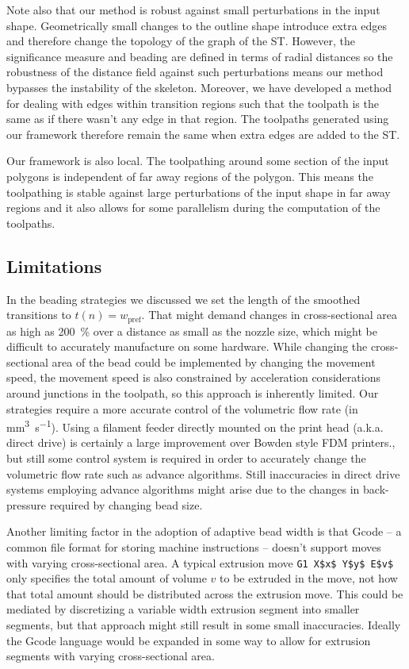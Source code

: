 Note also that our method is robust against small perturbations in the input shape.
Geometrically small changes to the outline shape introduce extra edges and therefore change the topology of the graph of the ST.
However, the significance measure and beading are defined in terms of radial distances so the robustness of the distance field against such perturbations means our method bypasses the instability of the skeleton.
Moreover, we have developed a method for dealing with edges within transition regions such that the toolpath is the same as if there wasn't any edge in that region.
The toolpaths generated using our framework therefore remain the same when extra edges are added to the ST.

Our framework is also local.
The toolpathing around some section of the input polygons is independent of far away regions of the polygon.
This means the toolpathing is stable against large perturbations of the input shape in far away regions
and it also allows for some parallelism during the computation of the toolpaths.



\subsection{Limitations}
In the beading strategies we discussed we set the length of the smoothed transitions to $t(n) = w_\text{pref}$.
That might demand changes in cross-sectional area as high as \SI{200}{\percent} over a distance as small as the nozzle size,
which might be difficult to accurately manufacture on some hardware.
While changing the cross-sectional area of the bead could be implemented by changing the movement speed, the movement speed is also constrained by acceleration considerations around junctions in the toolpath, so this approach is inherently limited.
Our strategies require a more accurate control of the volumetric flow rate (in \si{\milli\meter\cubed\per\second}).
Using a filament feeder directly mounted on the print head (a.k.a. direct drive) is certainly a large improvement over Bowden style FDM printers.,
but still some control system is required in order to accurately change the volumetric flow rate such as advance algorithms. \cite{tronvoll2019investigating}
Still inaccuracies in direct drive systems employing advance algorithms might arise due to the changes in back-pressure required by changing bead size.


Another limiting factor in the adoption of adaptive bead width is that Gcode -- a common file format for storing machine instructions -- doesn't support  moves with varying cross-sectional area.
A typical extrusion move \lstinline{G1 X$x$ Y$y$ E$v$} only specifies the total amount of volume $v$ to be extruded in the move, not how that total amount should be distributed across the extrusion move.
This could be mediated by discretizing a variable width extrusion segment into smaller segments, but that approach might still result in some small inaccuracies.
Ideally the Gcode language would be expanded in some way to allow for extrusion segments with varying cross-sectional area.


